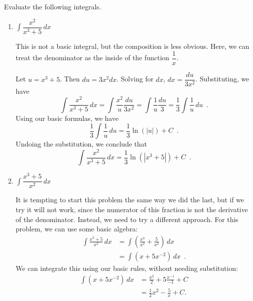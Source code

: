 \begin{example}
Evaluate the following integrals.
  \begin{enumerate}[label=(\alph*)]
    \item $\displaystyle\int \dfrac{x^2}{x^3+5}\,dx$

    \begin{solution}
      This is not a basic integral, but the composition is less obvious. Here, we can treat the denominator as the inside of the function $\dfrac{1}{x}$.

      Let $u=x^3+5$. Then $du=3x^2dx$. Solving for $dx$, $dx = \dfrac{du}{3x^2}$. Substituting, we have
      $$\int \frac{x^2}{x^3+5}\,dx = \int \frac{x^2}{u} \frac{du}{3x^2} = \int \frac{1}{u} \frac{du}{3} = \frac{1}{3} \int \frac{1}{u} \, du \enspace . $$
      Using our basic formulas, we have
      $$\frac{1}{3}\int \frac{1}{u}\,du = \frac{1}{3}\ln(|u|) + C \enspace .$$
      Undoing the substitution, we conclude that
      $$\int \frac{x^2}{x^3+5}\,dx = \frac{1}{3}\ln(|x^3+5|)+C \enspace .$$
    \end{solution}
    \item $\displaystyle\int \dfrac{x^3+5}{x^2}\,dx$

    \begin{solution}
      It is tempting to start this problem the same way we did the last, but if we try it will not work, since the numerator of this fraction is not the derivative of the denominator. Instead, we need to try a different approach. For this problem, we can use some basic algebra:
      \begin{align*}
      \int \frac{x^3+5}{x^2}\,dx &= \int \left(\frac{x^3}{x^2} + \frac{5}{x^2}\right)\,dx \\
        &= \int \left(x+5x^{-2}\right)\,dx \enspace.
      \end{align*}
      We can integrate this using our basic rules, without needing substitution:
      \begin{align*}
      \int \left(x+5x^{-2}\right)\,dx &= \frac{x^2}{2} + 5\frac{x^{-1}}{-1} + C\\
        &= \frac{1}{2}x^2 - \frac{5}{x} + C.
      \end{align*}
      \end{solution}
  \end{enumerate}

\end{example}

